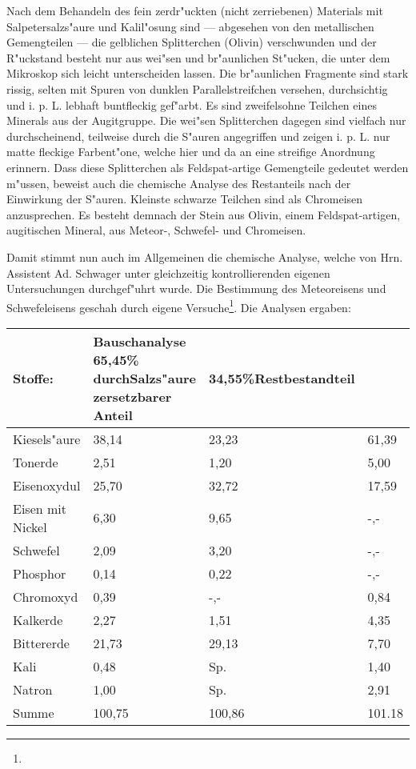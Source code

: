 \documentclass[a4paper, 11pt, oneside]{article}
\begin{document}
Nach dem Behandeln des fein zerdr"uckten (nicht zerriebenen) Materials mit Salpetersalzs"aure und Kalil"osung sind --- abgesehen von den metallischen Gemengteilen --- die gelblichen Splitterchen (Olivin) verschwunden und der R"uckstand besteht nur aus wei"sen und br"aunlichen St"ucken, die unter dem Mikroskop sich leicht unterscheiden lassen. Die br"aunlichen Fragmente sind stark rissig, selten mit Spuren von dunklen Parallelstreifchen versehen, durchsichtig und i. p. L. lebhaft buntfleckig gef"arbt. Es sind zweifelsohne Teilchen eines Minerals aus der Augitgruppe. Die wei"sen Splitterchen dagegen sind vielfach nur durchscheinend, teilweise durch die S"auren angegriffen und zeigen i. p. L. nur matte fleckige Farbent"one, welche hier und da an eine streifige Anordnung erinnern. Dass diese Splitterchen als Feldspat-artige Gemengteile gedeutet werden m"ussen, beweist auch die chemische Analyse des Restanteils nach der Einwirkung der S"auren. Kleinste schwarze Teilchen sind als Chromeisen anzusprechen. Es besteht demnach der Stein aus Olivin, einem Feldspat-artigen, augitischen Mineral, aus Meteor-, Schwefel- und Chromeisen.

Damit stimmt nun auch im Allgemeinen die chemische Analyse, welche von Hrn. Assistent Ad. Schwager unter gleichzeitig kontrollierenden eigenen Untersuchungen durchgef"uhrt wurde. Die Bestimmung des Meteoreisens und Schwefeleisens geschah durch eigene Versuche\footnote{}. Die Analysen ergaben:
\begin{center}
\begin{tabular}{ |p{27mm}|p{35mm}|p{25mm}|p{10mm}| }
    \hline
    Stoffe: & Bauschanalyse 65,45\% durch\newline Salzs"aure zersetzbarer Anteil & 34,55\%\newline Restbestandteil & \\
    \hline\hline
    Kiesels"aure & 38,14 & 23,23 & 61,39\\\hline
    Tonerde & 2,51 & 1,20 & 5,00\\\hline
    Eisenoxydul & 25,70 & 32,72 & 17,59\\\hline
    Eisen mit Nickel & 6,30 & 9,65 & -,-\\\hline
    Schwefel & 2,09 & 3,20 & -,-\\\hline
    Phosphor & 0,14 & 0,22 & -,-\\\hline
    Chromoxyd & 0,39 & -,- & 0,84\\\hline
    Kalkerde & 2,27 & 1,51 & 4,35\\\hline
    Bittererde & 21,73 & 29,13 & 7,70\\\hline
    Kali & 0,48 & Sp. & 1,40\\\hline
    Natron & 1,00 & Sp. & 2,91\\\hline
    Summe & 100,75 & 100,86 & 101.18\\
    \hline
\end{tabular}
\end{center}
\end{document}
